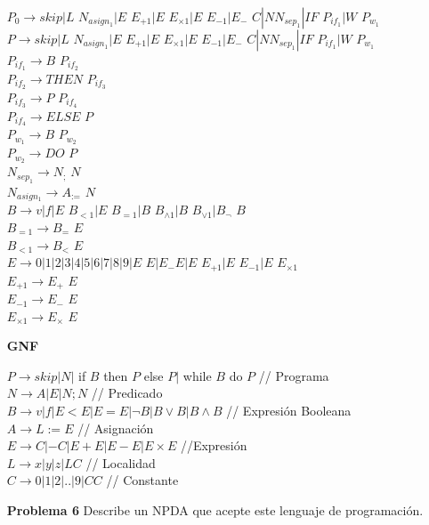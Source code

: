 \documentclass{article}
\begin{document}
\begin{enumerate}
$P_{0} \rightarrow skip |L$ $N_{asign_1}|E$ $E_{+1}|E$ $E_{\times1}|E$ $E_{-1}|E_{-}$ $C|N N_{sep_1}| IF$ $P_{if_1} |W$ $P_{w_1}$\\
$P \rightarrow skip |L$ $N_{asign_1}|E$ $E_{+1}|E$ $E_{\times1}|E$ $E_{-1}|E_{-}$ $C|N N_{sep_1}| IF$ $P_{if_1} |W$ $P_{w_1}$\\
$P_{if_1} \rightarrow B$ $P_{if_2}$\\
$P_{if_2} \rightarrow THEN$ $P_{if_3}$\\
$P_{if_3} \rightarrow P$ $P_{if_4}$\\
$P_{if_4} \rightarrow ELSE$ $P$\\
$P_{w_1} \rightarrow B$ $P_{w_2}$\\
$P_{w_2} \rightarrow DO$ $P$\\
$N_{sep_1}  \rightarrow N_{;}$ $N$\\
$N_{asign_1} \rightarrow A_{:=}$ $N$\\
$B \rightarrow v|f| E$ $B_{<1} | E$ $B_{=1} | B$ $B_{\wedge 1} | B$  $B_{\vee 1} | B_{\neg}$ $B $\\
$B_{=1} \rightarrow B_{=}$ $E$\\
$B_{<1} \rightarrow B_{<}$ $E$\\
$E \rightarrow 0|1|2|3|4|5|6|7|8|9|E$ $E|E_{-} E|E$ $E_{+1}|E$ $E_{-1}|E$ $E_{\times1}$\\
$E_{+1} \rightarrow E_{+}$ $E$\\
$E_{-1} \rightarrow E_{-}$ $E$\\
$E_{\times1} \rightarrow E_{\times}$ $E$\\


\item[\bf{GNF}]

$P \rightarrow skip |N|$ if $B$ then $P$ else $P |$ while $B$ do $P$   // Programa\\ 
$N \rightarrow A|E|N;N$ // Predicado\\
$B \rightarrow v|f|E<E|E=E|\neg B |B \vee B| B \wedge B $ // Expresión Booleana\\
$A \rightarrow L:=E$ // Asignación\\
$E \rightarrow C|-C|E+E|E-E|E \times E$ //Expresión\\
$L \rightarrow x|y|z|LC$ // Localidad\\
$C \rightarrow 0|1|2|..|9|CC$ // Constante




\item[\bf{Problema 6}]  Describe un NPDA que acepte este lenguaje de programación.


\end{enumerate}
\end{document}
